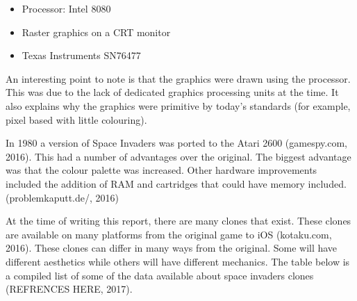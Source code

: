 \documentclass[12pt]{article}
\begin{document}
\begin{itemize}
	\item Processor: Intel 8080
	\item Raster graphics on a CRT monitor
	\item Texas Instruments SN76477
\end{itemize}

An interesting point to note is that the graphics were drawn using the processor. This was due to the lack of dedicated graphics processing units at the time. It also explains why the graphics were primitive by today's standards (for example, pixel based with little colouring).

In 1980 a version of Space Invaders was ported to the Atari 2600 (gamespy.com, 2016). This had a number of advantages over the original. The biggest advantage was that the colour palette was increased. Other hardware improvements included the addition of RAM and cartridges that could have memory included. (problemkaputt.de/, 2016)

At the time of writing this report, there are many clones that exist. These clones are available on many platforms from the original game to iOS (kotaku.com, 2016). These clones can differ in many ways from the original. Some will have different aesthetics while others will have different mechanics. The table below is a compiled list of some of the data available about space invaders clones (REFRENCES HERE, 2017).
\end{document}
